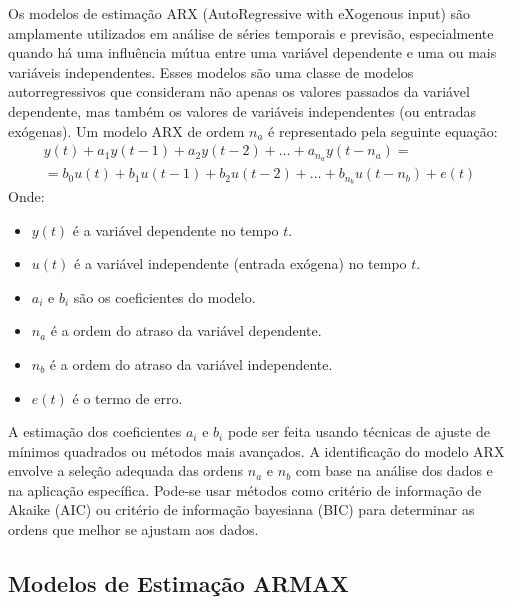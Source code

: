 \documentclass[a4paper,12pt]{article}
\begin{document}
Os modelos de estimação ARX (AutoRegressive with eXogenous input) são amplamente utilizados em análise de séries temporais e previsão, especialmente quando há uma influência mútua entre uma variável dependente e uma ou mais variáveis independentes. Esses modelos são uma classe de modelos autorregressivos que consideram não apenas os valores passados da variável dependente, mas também os valores de variáveis independentes (ou entradas exógenas). Um modelo ARX de ordem \(n_a\) é representado pela seguinte equação:
\begin{align*}
    y(t) + a_1 y(t-1) + a_2 y(t-2) + \ldots + a_{n_a} y(t-n_a) = \\
    = b_0 u(t) + b_1 u(t-1) + b_2 u(t-2) + \ldots + b_{n_b} u(t-n_b) + e(t)\tag{2.11.1}
\end{align*}
Onde:
\begin{itemize}
    \item \(y(t)\) é a variável dependente no tempo \(t\).
    \item \(u(t)\) é a variável independente (entrada exógena) no tempo \(t\).
    \item \(a_i\) e \(b_i\) são os coeficientes do modelo.
    \item \(n_a\) é a ordem do atraso da variável dependente.
    \item \(n_b\) é a ordem do atraso da variável independente.
    \item \(e(t)\) é o termo de erro.
\end{itemize}
A estimação dos coeficientes \(a_i\) e \(b_i\) pode ser feita usando técnicas de ajuste de mínimos quadrados ou métodos mais avançados. A identificação do modelo ARX envolve a seleção adequada das ordens \(n_a\) e \(n_b\) com base na análise dos dados e na aplicação específica. Pode-se usar métodos como critério de informação de Akaike (AIC) ou critério de informação bayesiana (BIC) para determinar as ordens que melhor se ajustam aos dados.

\subsection{Modelos de Estimação ARMAX}
\end{document}
